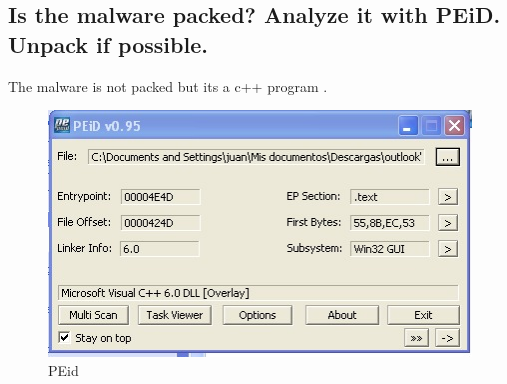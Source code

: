 \documentclass[12pt,letter]{article} %
\begin{document}
        \subsection{Is the malware packed? Analyze it with PEiD. Unpack if possible.}
            The malware is not packed but its a c++ program .\\
            \begin{figure}[h!]
                \centering
                \includegraphics[scale=0.5]{Peid.jpeg}
                \caption{PEid}
                \label{fig:Peid}
            \end{figure}$ $\\
\end{document}
